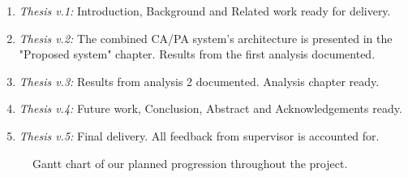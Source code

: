 \documentclass[informationsecurity]{gucmasterproject}
\begin{document}
\begin{enumerate}
    \item \textit{Thesis v.1:} Introduction, Background and Related work ready for delivery.
    \item \textit{Thesis v.2:} The combined CA/PA system's architecture is presented in the "Proposed system" chapter. Results from the first analysis documented.
    \item \textit{Thesis v.3:} Results from analysis 2 documented. Analysis chapter ready.
    \item \textit{Thesis v.4:} Future work, Conclusion, Abstract and Acknowledgements ready.
    \item \textit{Thesis v.5:} Final delivery. All feedback from supervisor is accounted for.
\end{enumerate}


\begin{figure}[h]
    \centering
    \caption{Gantt chart of our planned progression throughout the project.}
    \label{fig:gantt}
\end{figure}

\end{document}
